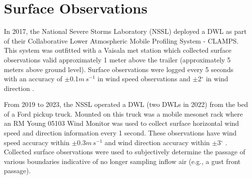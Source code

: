 \section{Surface Observations}
In 2017, the National Severe Storms Laboratory (NSSL) deployed a DWL as part of their Collaborative Lower Atmospheric Mobile Profiling System - CLAMPS. This system was outfitted with a Vaisala met station which collected surface observations valid approximately 1 meter above the trailer (approximately 5 meters above ground level). Surface observations were logged every 5 seconds with an accuracy of $\pm$0.1$m\, s^{-1}$ in wind speed observations and $\pm$2$^\circ$ in wind direction \citep{WINDCAP}. 

From 2019 to 2023, the NSSL operated a DWL (two DWLs in 2022) from the bed of a Ford pickup truck. Mounted on this truck was a mobile mesonet rack where an RM Young 05103 Wind Monitor was used to collect surface horizontal wind speed and direction information every 1 second. These observations have wind speed accuracy within $\pm$0.3$m\, s^{-1}$ and wind direction accuracy within $\pm$3$^\circ$ \citep{waugh2021u}. Collected surface observations were used to subjectively determine the passage of various boundaries indicative of no longer sampling inflow air (e.g., a gust front passage).